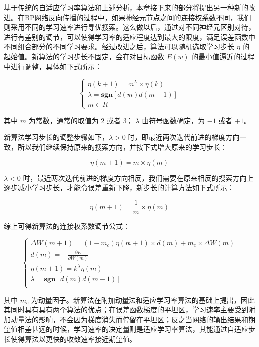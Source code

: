 \documentclass[UTF8]{ctexart}
\begin{document}
基于传统的自适应学习率算法和上述分析，本章接下来的部分将提出另一种新的改进。在BP网络反向传播的过程中，如果神经元节点之间的连接权系数不同，我们则采用不同的学习速率进行寻优搜索。这么做以后，通过对不同神经元区别对待，进行有差别的调节，可以使得学习率的适应程度达到最大的限度，满足误差函数中不同组合部分的不同学习要求。经过改进之后，算法可以随机选取学习步长 $\eta$ 的起始值。新算法的学习步长不固定，会在对目标函数 $E(w)$ 的最小值逼近的过程中进行调整，具体如下式所示：

\begin{equation}
\begin{cases}
\eta (k+1) = m^{\lambda} \times \eta(k) \\
\lambda = \mathbf{sgn} [d(m) d(m-1)] \\
m \in R
\end{cases}
\end{equation}

其中 $m$ 为常数，通常的取值为 $2$ 或者 $3$； $\lambda$ 由符号函数确定，为 $-1$ 或者 $+1$。 \par

新算法学习步长的调整步骤如下，$\lambda > 0$ 时，即最近两次迭代前进的梯度方向一致，所以我们继续保持原来的搜索方向，并按下式增大原来的学习步长：

\begin{equation}
\eta(m+1) = m \times \eta(m)
\end{equation}

$\lambda < 0$ 时，最近两次迭代前进的梯度方向相反，我们需要在原来相反的搜索方向上逐步减小学习步长，才能令误差重新下降，新步长的计算方法如下式所示：

\begin{equation}
\eta(m+1) = \frac{1}{m} \times \eta(m)
\end{equation}

综上可得新算法的连接权系数调节公式：

\begin{equation}
\begin{cases}
\Delta W(m+1) = (1-m_c) \eta (m+1) \times d(m) + m_c \times \Delta W(m) \\
d(m) = - \frac{\partial E}{\partial W(m)} \\
\eta(m+1) = k^{\lambda} \eta (m) \\
\lambda = \mathbf{sgn} [d(m) d(m-1)] \\
\end{cases}
\end{equation}

其中 $m_c$ 为动量因子。新算法在附加动量法和适应学习率算法的基础上提出，因此其同时具有具有两个算法的优点；在误差函数梯度的平坦区，学习速率主要受到附加动量法的影响，不会因为梯度消失而停留在平坦区；反之当网络的输出结果和期望值相差甚远的时候，学习速率的决定量则是适应学习率算法，其能通过自适应步长使得算法以更快的收敛速率接近期望值。\par
\end{document}
